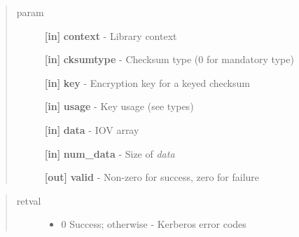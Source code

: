\documentclass[letterpaper,10pt,english]{sphinxmanual}
\begin{document}
\begin{fulllineitems}
\label{appdev/refs/api/krb5_k_verify_checksum_iov:krb5_k_verify_checksum_iov}
\end{fulllineitems}

\begin{quote}\begin{description}
\item[{param}] \leavevmode
\textbf{{[}in{]}} \textbf{context} - Library context

\textbf{{[}in{]}} \textbf{cksumtype} - Checksum type (0 for mandatory type)

\textbf{{[}in{]}} \textbf{key} - Encryption key for a keyed checksum

\textbf{{[}in{]}} \textbf{usage} - Key usage (see  types)

\textbf{{[}in{]}} \textbf{data} - IOV array

\textbf{{[}in{]}} \textbf{num\_data} - Size of \emph{data}

\textbf{{[}out{]}} \textbf{valid} - Non-zero for success, zero for failure

\end{description}\end{quote}
\begin{quote}\begin{description}
\item[{retval}] \leavevmode\begin{itemize}
\item {} 
0   Success; otherwise - Kerberos error codes

\end{itemize}

\end{description}\end{quote}
\end{document}
